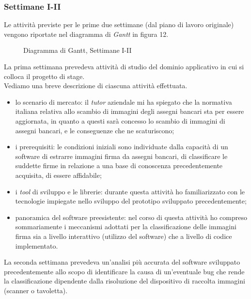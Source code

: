 \subsubsection{Settimane I-II}
\label{3.1.1}
Le attività previste per le prime due settimane (dal piano di lavoro originale) vengono riportate nel diagramma di \emph{Gantt} in figura 12.
\begin{figure}[H]
\centering
\noindent{}
\caption{Diagramma di Gantt, Settimane I-II}
\end{figure}
La prima settimana prevedeva attività di studio del dominio applicativo in cui si colloca il progetto di stage.\\
Vediamo una breve descrizione di ciascuna attività effettuata.
\begin{itemize}
\item lo scenario di mercato: il \emph{tutor} aziendale mi ha spiegato che la normativa italiana relativa allo scambio di immagini degli assegni bancari sta per essere aggiornata, in quanto a questi sarà concesso lo scambio di immagini di assegni bancari, e le conseguenze che ne scaturiscono;
\item i prerequisiti: le condizioni iniziali sono individuate dalla capacità di un software di estrarre immagini firma da assegni bancari, di classificare le suddette firme in relazione a una base di conoscenza precedentemente acquisita, di essere affidabile;
\item i \emph{tool} di sviluppo e le librerie: durante questa attività ho familiarizzato con le tecnologie impiegate nello sviluppo del prototipo sviluppato precedentemente;
\item panoramica del software preesistente: nel corso di questa attività ho compreso sommariamente i meccanismi adottati per la classificazione delle immagini firma sia a livello interattivo (utilizzo del software) che a livello di codice implementato.
\end{itemize}
La seconda settimana prevedeva un'analisi più accurata del software sviluppato precedentemente allo scopo di identificare la causa di un'eventuale bug che rende la classificazione dipendente dalla risoluzione del dispositivo di raccolta immagini (scanner o tavoletta).\\\\
